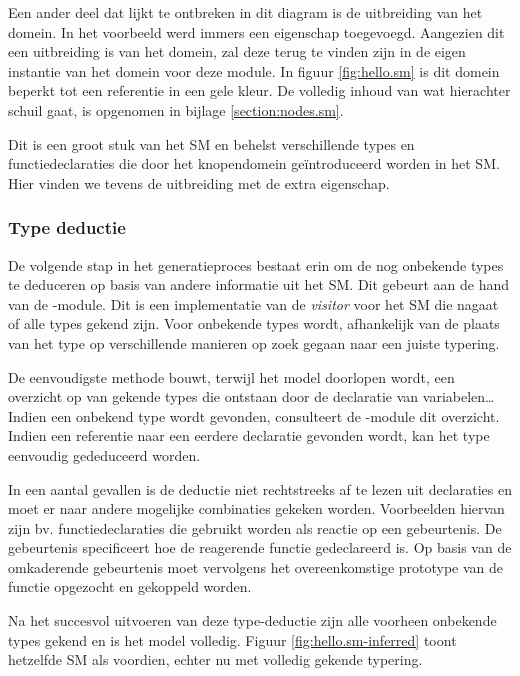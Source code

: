 Een ander deel dat lijkt te ontbreken in dit diagram is de uitbreiding van het
domein. In het voorbeeld werd immers een eigenschap  toegevoegd.
Aangezien dit een uitbreiding is van het domein, zal deze terug te vinden zijn
in de eigen instantie van het domein voor deze module. In figuur
\ref{fig:hello.sm} is dit domein beperkt tot een referentie in een gele kleur.
De volledig inhoud van wat hierachter schuil gaat, is opgenomen in bijlage
\ref{section:nodes.sm}.

Dit is een groot stuk van het SM en behelst verschillende types en
functiedeclaraties die door het knopendomein ge\"introduceerd worden in het SM.
Hier vinden we tevens de uitbreiding met de extra  eigenschap.

\vspace{-3mm}

\subsubsection{Type deductie}

De volgende stap in het generatieproces bestaat erin om de nog onbekende types
te deduceren op basis van andere informatie uit het SM. Dit gebeurt aan de hand
van de -module. Dit is een implementatie van de \emph{visitor}
voor het SM die nagaat of alle types gekend zijn. Voor onbekende types wordt,
afhankelijk van de plaats van het type op verschillende manieren op zoek gegaan
naar een juiste typering.

De eenvoudigste methode bouwt, terwijl het model doorlopen wordt, een overzicht
op van gekende types die ontstaan door de declaratie van variabelen\dots Indien
een onbekend type wordt gevonden, consulteert de -module dit
overzicht. Indien een referentie naar een eerdere declaratie gevonden wordt,
kan het type eenvoudig gededuceerd worden.

In een aantal gevallen is de deductie niet rechtstreeks af te lezen uit
declaraties en moet er naar andere mogelijke combinaties gekeken worden.
Voorbeelden hiervan zijn bv. functiedeclaraties die gebruikt worden als reactie
op een gebeurtenis. De gebeurtenis specificeert hoe de reagerende functie
gedeclareerd is. Op basis van de omkaderende gebeurtenis moet vervolgens het
overeenkomstige prototype van de functie opgezocht en gekoppeld worden.

Na het succesvol uitvoeren van deze type-deductie zijn alle voorheen onbekende
types gekend en is het model volledig. Figuur \ref{fig:hello.sm-inferred} toont
hetzelfde SM als voordien, echter nu met volledig gekende typering.

